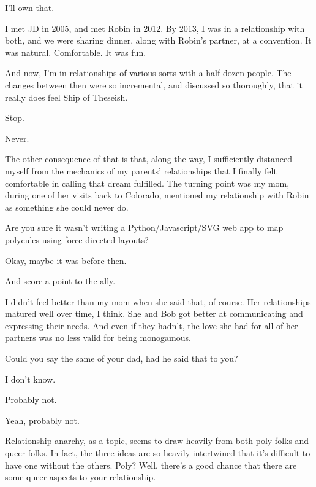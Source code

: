 \begin{paracol}{2}
\begin{leftcolumn}
\begin{ally}
I'll own that.
\end{ally}
I met JD in 2005, and met Robin in 2012. By 2013, I was in a relationship with both, and we were sharing dinner, along with Robin's partner, at a convention. It was natural. Comfortable. It was fun.

And now, I'm in relationships of various sorts with a half dozen people. The changes between then were so incremental, and discussed so thoroughly, that it really does feel Ship of Theseish.

\begin{ally}
Stop.
\end{ally}
Never.

The other consequence of that is that, along the way, I sufficiently distanced myself from the mechanics of my parents' relationships that I finally felt comfortable in calling that dream fulfilled. The turning point was my mom, during one of her visits back to Colorado, mentioned my relationship with Robin as something she could never do.

\begin{ally}
Are you sure it wasn't writing a Python/Javascript/SVG web app to map polycules using force-directed layouts?
\end{ally}
Okay, maybe it was before then.

\begin{ally}
And score a point to the ally.
\end{ally}
I didn't feel better than my mom when she said that, of course. Her relationships matured well over time, I think. She and Bob got better at communicating and expressing their needs. And even if they hadn't, the love she had for all of her partners was no less valid for being monogamous.

\begin{ally}
Could you say the same of your dad, had he said that to you?
\end{ally}
I don't know.

\begin{ally}
Probably not.
\end{ally}
Yeah, probably not.
\newpage

\noindent Relationship anarchy, as a topic, seems to draw heavily from both poly folks and queer folks. In fact, the three ideas are so heavily intertwined that it's difficult to have one without the others. Poly? Well, there's a good chance that there are some queer aspects to your relationship.


\end{leftcolumn}
\end{paracol}
